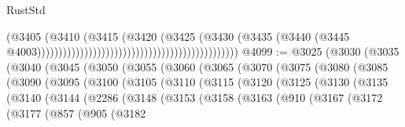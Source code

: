 \begin{lexlean}{RustStd}
\begin{coremodule}
                                                                                (@3405
                                                                                  (@3410
                                                                                    (@3415
                                                                                      (@3420
                                                                                        (@3425
                                                                                          (@3430
                                                                                            (@3435
                                                                                              (@3440
                                                                                                (@3445
                                                                                                  @4003)))))))))))))))))))))))))))))))))))))))))))))))
@4099 := @3025
    (@3030
      (@3035
        (@3040
          (@3045
            (@3050
              (@3055
                (@3060
                  (@3065
                    (@3070
                      (@3075
                        (@3080
                          (@3085
                            (@3090
                              (@3095
                                (@3100
                                  (@3105
                                    (@3110
                                      (@3115
                                        (@3120
                                          (@3125
                                            (@3130
                                              (@3135
                                                (@3140
                                                  (@3144
                                                    (@2286
                                                      (@3148
                                                        (@3153
                                                          (@3158
                                                            (@3163
                                                              (@910
                                                                (@3167
                                                                  (@3172
                                                                    (@3177
                                                                      (@857
                                                                        (@905
                                                                          (@3182

\end{coremodule}
\end{lexlean}
